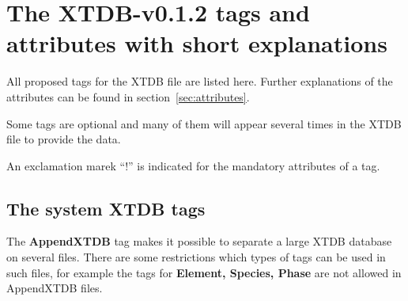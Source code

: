 \documentclass{article}
\begin{document}
\newpage

\section{The XTDB-v0.1.2 tags and attributes with short explanations}\label{sec:tags}

All proposed tags for the XTDB file are listed here. Further
explanations of the attributes can be found in
section~\ref{sec:attributes}.

Some tags are optional and many of them will appear several times in
the XTDB file to provide the data.

An exclamation marek ``!'' is indicated for the mandatory attributes of a tag.

\subsection{The system XTDB tags}\label{sec:first}

The {\bf AppendXTDB} tag makes it possible to separate a large XTDB
database on several files.  There are some restrictions which types of
tags can be used in such files, for example the tags for {\bf Element,
  Species, Phase} are not allowed in AppendXTDB files.
\end{document}
